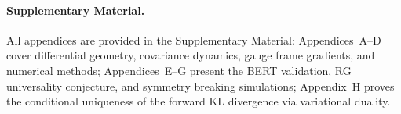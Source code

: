 \documentclass[twoside,11pt]{article}
\begin{document}
\paragraph{Supplementary Material.} All appendices are provided in the Supplementary Material: Appendices~A--D cover differential geometry, covariance dynamics, gauge frame gradients, and numerical methods; Appendices~E--G present the BERT validation, RG universality conjecture, and symmetry breaking simulations; Appendix~H proves the conditional uniqueness of the forward KL divergence via variational duality.



\end{document}
